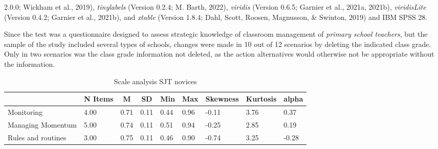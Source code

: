 \documentclass[
  man]{apa6}
\begin{document}
2.0.0; Wickham et al., 2019), \emph{tinylabels} (Version 0.2.4; M. Barth, 2022), \emph{viridis} (Version 0.6.5; Garnier et al., 2021a, 2021b), \emph{viridisLite} (Version 0.4.2; Garnier et al., 2021b), and \emph{xtable} (Version 1.8.4; Dahl, Scott, Roosen, Magnusson, \& Swinton, 2019) and IBM SPSS 28.

Since the test was a questionnaire designed to assess strategic knowledge of classroom management of \emph{primary school teachers}, but the sample of the study included several types of schools, changes were made in 10 out of 12 scenarios by deleting the indicated class grade. Only in two scenarios was the class grade information not deleted, as the action alternatives would otherwise not be appropriate without the information.

\begin{table}[h]

\begin{center}
\begin{threeparttable}

\caption{\label{tab:sjt}Scale analysis SJT novices}

\tiny{

\begin{tabular}{lllllllll}
\toprule
 & \multicolumn{1}{c}{N Items} & \multicolumn{1}{c}{M} & \multicolumn{1}{c}{SD} & \multicolumn{1}{c}{Min} & \multicolumn{1}{c}{Max} & \multicolumn{1}{c}{Skewness} & \multicolumn{1}{c}{Kurtosis} & \multicolumn{1}{c}{alpha}\\
\midrule
Monitoring & 4.00 & 0.71 & 0.11 & 0.44 & 0.96 & -0.11 & 3.76 & 0.37\\
Managing Momentum & 5.00 & 0.74 & 0.11 & 0.51 & 0.94 & -0.25 & 2.85 & 0.19\\
Rules and routines & 3.00 & 0.75 & 0.11 & 0.46 & 0.90 & -0.74 & 3.25 & -0.28\\
\bottomrule
\end{tabular}

}

\end{threeparttable}
\end{center}

\end{table}
\end{document}

